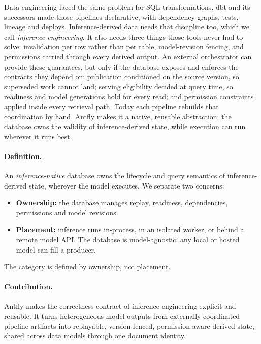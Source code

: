 \documentclass[sigconf,nonacm]{acmart}
\begin{document}
Data engineering faced the same problem for SQL transformations. dbt and its
successors made those pipelines declarative, with dependency graphs, tests,
lineage and deploys. Inference-derived data needs that discipline too, which
we call \emph{inference engineering}. It also needs three things those tools
never had to solve: invalidation per row rather than per table,
model-revision fencing, and permissions carried through every derived output.
An external orchestrator can provide these guarantees, but only if the
database exposes and enforces the contracts they depend on: publication
conditioned on the source version, so superseded work cannot land; serving
eligibility decided at query time, so readiness and model generations hold
for every read; and permission constraints applied inside every retrieval
path. Today each pipeline rebuilds that coordination by hand. Antfly makes it
a native, reusable abstraction: the database owns the validity of
inference-derived state, while execution can run wherever it runs best.

\paragraph{Definition.} An \emph{inference-native} database owns the
lifecycle and query semantics of inference-derived state, wherever the model
executes. We separate two concerns:
\begin{itemize}
  \item \textbf{Ownership:} the database manages replay, readiness,
    dependencies, permissions and model revisions.
  \item \textbf{Placement:} inference runs in-process, in an isolated worker,
    or behind a remote model API. The database is model-agnostic: any local or
    hosted model can fill a producer.
\end{itemize}
The category is defined by ownership, not placement.

\paragraph{Contribution.} Antfly makes the correctness contract of inference
engineering explicit and reusable. It turns heterogeneous model outputs from
externally coordinated pipeline artifacts into replayable, version-fenced,
permission-aware derived state, shared across data models through one
document identity.

\end{document}
